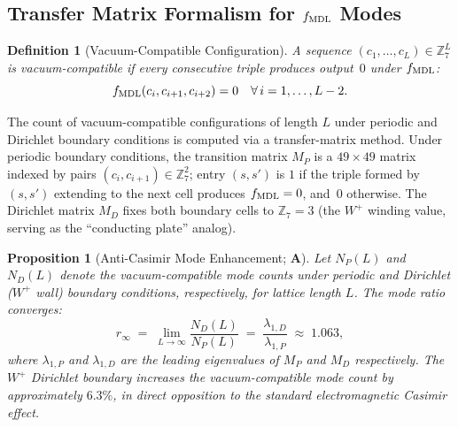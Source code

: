 \documentclass[11pt]{article}
\newtheorem{proposition}[theorem]{Proposition}
\newtheorem{definition}[theorem]{Definition}
\theoremstyle{remark}
\newcommand{\CatA}{\textbf{A}}
\begin{document}
\subsection{Transfer Matrix Formalism for \texorpdfstring{$f_{\rm MDL}$}{fMDL} Modes}
\label{sec:casimir_matrix}

\begin{definition}[Vacuum-Compatible Configuration]
A sequence $(c_1, \ldots, c_L) \in \mathbb{Z}_7^L$ is
\emph{vacuum-compatible} if every consecutive triple produces output~$0$
under $f_{\rm MDL}$:
\[
  f_{\rm MDL}(c_i, c_{i+1}, c_{i+2}) = 0
  \quad \forall\, i = 1, \ldots, L-2.
\]
\end{definition}

The count of vacuum-compatible configurations of length $L$ under
periodic and Dirichlet boundary conditions is computed via a
transfer-matrix method.  Under periodic boundary conditions,
the transition matrix $M_P$ is a $49 \times 49$ matrix indexed by
pairs $(c_i, c_{i+1}) \in \mathbb{Z}_7^2$; entry $(s, s')$ is $1$ if the
triple formed by $(s, s')$ extending to the next cell produces
$f_{\rm MDL} = 0$, and~$0$ otherwise.
The Dirichlet matrix $M_D$ fixes both boundary cells to
$\mathbb{Z}_7 = 3$ (the $W^+$ winding value, serving as the ``conducting
plate'' analog).

\begin{proposition}[Anti-Casimir Mode Enhancement; $\CatA$]
\label{prop:casimir}
Let $N_P(L)$ and $N_D(L)$ denote the vacuum-compatible mode counts under
periodic and Dirichlet ($W^+$ wall) boundary conditions, respectively, for
lattice length $L$.  The mode ratio converges:
\begin{equation}
  r_\infty \;=\; \lim_{L \to \infty} \frac{N_D(L)}{N_P(L)}
  \;=\; \frac{\lambda_{1,D}}{\lambda_{1,P}}
  \;\approx\; 1.063,
  \label{eq:casimir_ratio}
\end{equation}
where $\lambda_{1,P}$ and $\lambda_{1,D}$ are the leading eigenvalues of
$M_P$ and $M_D$ respectively.
The $W^+$ Dirichlet boundary \emph{increases} the vacuum-compatible mode
count by approximately $6.3\%$, in direct opposition to the standard
electromagnetic Casimir effect.
\end{proposition}
\end{document}
